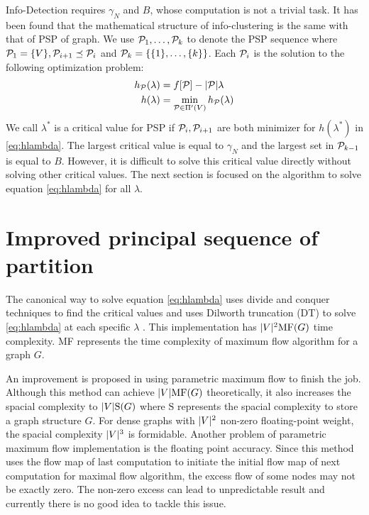 \documentclass[runningheads]{llncs}
\begin{document}
Info-Detection requires $\gamma_N$ and $B$, whose computation is not a trivial task. It has been found that the mathematical structure of info-clustering is the same with that of PSP of graph. We use $\P_1, \dots, \P_k$ to denote the PSP sequence where $\P_1 = \{V\}, \P_{i+1} \preceq \P_i$ and $\P_k = \{\{1\},\dots,\{k\}\}$.
Each $\P_i$ is the solution to the following optimization problem:
\begin{align}
h_{\P}(\lambda) &=  f[\P] - \abs{\P} \lambda  \label{eq:hPL}\\
h(\lambda) &= \min_{\P \in \Pi'(V)} h_{\P}(\lambda) \label{eq:hlambda}
\end{align}
We call $\lambda^*$ is a critical value for PSP if $\P_i, \P_{i+1}$ are both minimizer for $h(\lambda^*)$ in \eqref{eq:hlambda}.
The largest critical value is equal to $\gamma_N$ and the largest set in $\P_{k-1}$ is equal to $B$. However, it is difficult to solve this critical value directly without solving other critical values. The next section is focused on the algorithm to solve equation \eqref{eq:hlambda} for all $\lambda$.

\section{Improved principal sequence of partition}\label{sec:Alg}
The canonical way to solve equation \eqref{eq:hlambda} uses divide and conquer techniques to find the critical values and uses Dilworth truncation (DT) to solve \eqref{eq:hlambda} at each specific $\lambda$ \cite{RN7}.  This implementation has $\abs{V}^2 \textrm{MF}(G)$ time complexity. \textrm{MF} represents the time complexity of maximum flow algorithm for a graph $G$. 

An improvement is proposed in \cite{RN4} using parametric maximum flow to finish the job. Although this method can achieve $\abs{V} \textrm{MF}(G)$ theoretically, it also increases the spacial complexity to $ \abs{V} \textrm{S}(G)$ where $\textrm{S}$ represents the spacial complexity to store a graph structure $G$. For dense graphs with $\abs{V}^2$ non-zero floating-point weight, the spacial complexity $\abs{V}^3$ is formidable. 
Another problem of parametric maximum flow implementation is the floating point accuracy. Since this method uses the flow map of last computation to initiate the initial flow map of next computation for maximal flow algorithm, the excess flow of some nodes may not be exactly zero. The non-zero excess can lead to unpredictable result and currently there is no good idea to tackle this issue. 
\end{document}
